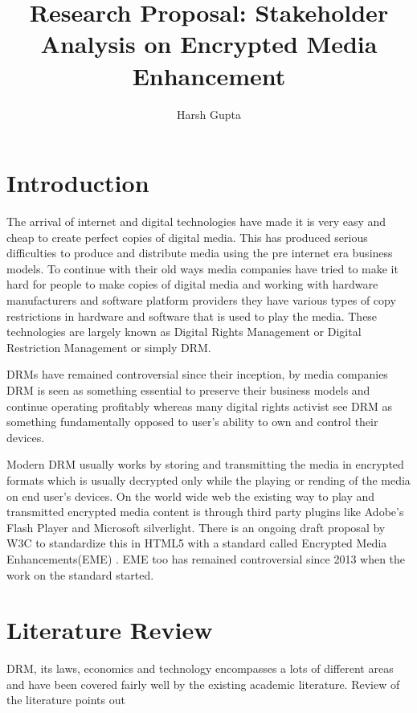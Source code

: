 \documentclass{article}
\title{Research Proposal: Stakeholder Analysis on Encrypted Media Enhancement}
\author{Harsh Gupta}
\begin{document}
\maketitle

\section*{Introduction}

The arrival of internet and digital technologies have made it is very easy and
cheap to create perfect copies of digital media. This has produced serious
difficulties to produce and distribute media using the pre internet era
business models. To continue with their old ways media companies have tried to
make it hard for people to make copies of digital media and working with
hardware manufacturers and software platform providers they have various types
of copy restrictions in hardware and software that is used to play the media.
These technologies are largely known as Digital Rights Management or Digital
Restriction Management or simply DRM.

DRMs have remained controversial since their inception, by media companies DRM
is seen as something essential to preserve their business models and continue
operating profitably whereas many digital rights activist see DRM as something
fundamentally opposed to user's ability to own and control their devices.

Modern DRM usually works by storing and transmitting the media in encrypted
formats which is usually decrypted only while the playing or rending of the
media on end user's devices. On the world wide web the existing way to play and
transmitted encrypted media content is through third party plugins like Adobe's
Flash Player and Microsoft silverlight. There is an ongoing draft proposal by
W3C to standardize this in HTML5 with a standard called Encrypted Media
Enhancements(EME) \cite{david_dorwin_encrypted_????}. EME too has remained
controversial since 2013 when the work on the standard started.

\section*{Literature Review}

DRM, its laws, economics and technology encompasses a lots of different areas and have
been covered fairly well by the existing academic literature. Review of the
literature points out	
\end{document}
